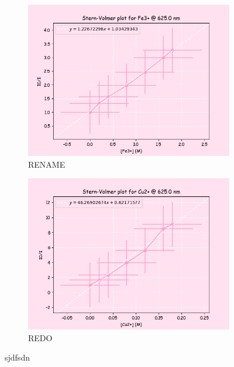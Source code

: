 \begin{figure}[H]
     \centering
     \begin{subfigure}[b]{0.49\textwidth}
         \centering
         \includegraphics[width=\textwidth]{part1_q1_Fe.png}
         \caption{RENAME}
         \label{fig:part1_q1_fe}
     \end{subfigure}
     \hfill
     \begin{subfigure}[b]{0.49\textwidth}
         \centering
         \includegraphics[width=\textwidth]{part1_q1_Cu.png}
         \caption{REDO}
         \label{fig:part1_q1_Cu}
     \end{subfigure}
     \caption{sjdfsdn}
     \label{fig:stern_volmers}
\end{figure}
